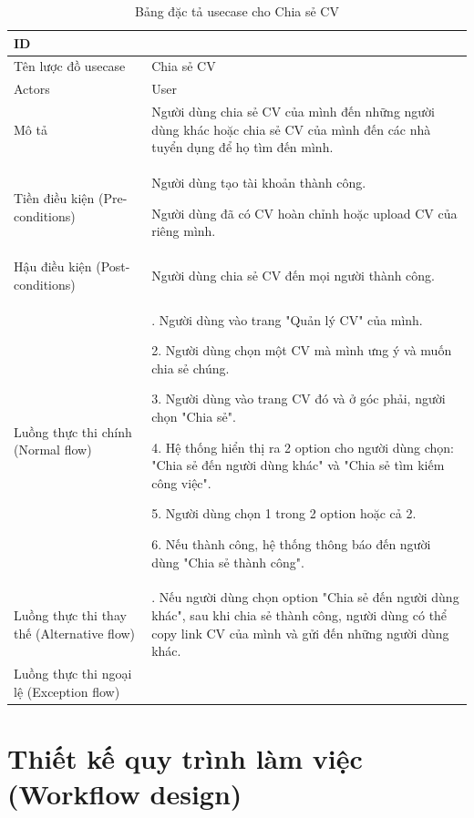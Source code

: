 \begin{table}[H]
    \centering
    \begin{tabular}{|>{\centering\arraybackslash}p{0.3\linewidth}|>{\raggedright\arraybackslash}p{0.7\linewidth}|} \hline 
         ID
& 7\\ \hline 
         
Tên lược đồ usecase
& Chia sẻ CV\\ \hline 
         Actors
& User\\ \hline 
         
Mô tả
& Người dùng chia sẻ CV của mình đến những người dùng khác hoặc chia sẻ CV của mình đến các nhà tuyển dụng để họ tìm đến mình.\\ \hline 
         Tiền điều kiện (Pre-conditions)
& Người dùng tạo tài khoản thành công.

Người dùng đã có CV hoàn chỉnh hoặc upload CV của riêng mình.\\ \hline 
         
Hậu điều kiện (Post-conditions)& Người dùng chia sẻ CV đến mọi người thành công.\\ \hline 
         Luồng thực thi chính (Normal flow)& 1. Người dùng vào trang "Quản lý CV" của mình.

2. Người dùng chọn một CV mà mình ưng ý và muốn chia sẻ chúng.

3. Người dùng vào trang CV đó và ở góc phải, người chọn "Chia sẻ".

4. Hệ thống hiển thị ra 2 option cho người dùng chọn: "Chia sẻ đến người dùng khác" và "Chia sẻ tìm kiếm công việc".

5. Người dùng chọn 1 trong 2 option hoặc cả 2.

6. Nếu thành công, hệ thống thông báo đến người dùng "Chia sẻ thành công".\\ \hline 
         
Luồng thực thi thay thế (Alternative flow)
& 6.1. Nếu người dùng chọn option "Chia sẻ đến người dùng khác", sau khi chia sẻ thành công, người dùng có thể copy link CV của mình và gửi đến những người dùng khác.\\ \hline
 Luồng thực thi ngoại lệ (Exception flow)&\\\hline
    \end{tabular}
    \caption{Bảng đặc tả usecase cho Chia sẻ CV}
    \label{tab:Chia sẻ CV}
\end{table}





\section{Thiết kế quy trình làm việc (Workflow design)}


